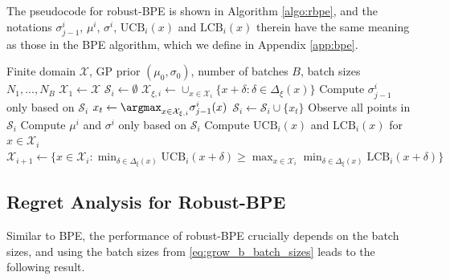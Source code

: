 \documentclass[10pt]{article}
\begin{document}
The pseudocode for robust-BPE is shown in Algorithm \ref{algo:rbpe}, and the notations $\sigma^i_{j-1}$, $\mu^i$, $\sigma^i$, $\mathrm{UCB}_i(x)$ and $\mathrm{LCB}_i(x)$ therein have the same meaning as those in the BPE algorithm, which we define in Appendix \ref{app:bpe}. 

\begin{algorithm}[!t]
\caption{Robust-BPE for finite domain \label{algo:rbpe}}
\begin{algorithmic}[1]
    \REQUIRE Finite domain $\mathcal{X}$, GP prior $(\mu_0, \sigma_0)$, number of batches $B$, batch sizes $N_1, ..., N_B$
    \STATE $\mathcal{X}_1 \gets \mathcal{X}$
        \STATE $\mathcal{S}_i\gets\emptyset$
        \STATE $\mathcal{X}_{\xi, i}\gets \cup_{x\in\mathcal{X}_i}\{x+\delta:\delta\in\Delta_{\xi}(x) \} $ \label{line:set_to_explore}
            \STATE Compute $\sigma^i_{j-1}$ only based on $\mathcal{S}_i$
            \STATE $x_t \gets \argmax_{x\in \mathcal{X}_{\xi, i}} \sigma^i_{j-1}(x)$
            \STATE $\mathcal{S}_i\gets \mathcal{S}_i\cup\{x_t\}$
        \ENDFOR
        \STATE Observe all points in $\mathcal{S}_i$
        \STATE Compute $\mu^{i}$ and $\sigma^{i}$ only based on $\mathcal{S}_i$
        \STATE Compute $\mathrm{UCB}_i(x)$ and $\mathrm{LCB}_i(x)$ for $x\in\mathcal{X}_i$
        \STATE $\mathcal{X}_{i+1} \gets \{ x \in \mathcal{X}_{i}: \min_{\delta\in\Delta_{\xi}(x)} \mathrm{UCB}_i(x+\delta) \geq \max_{x\in{\mathcal{X}_i}} \min_{\delta\in\Delta_{\xi}(x)} \mathrm{LCB}_i(x+\delta) \}$ \label{line:eliminate_rule}
    \ENDFOR   
\end{algorithmic}
\end{algorithm}

\subsection{Regret Analysis for Robust-BPE}
Similar to BPE, the performance of robust-BPE crucially depends on the batch sizes, and using the batch sizes from \eqref{eq:grow_b_batch_sizes} leads to the following result.
\end{document}
